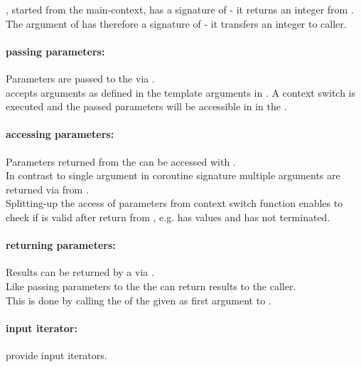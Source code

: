 \coro, started from the main-context, has a signature of  - it
returns an integer from \corofunction.\\
The \coro argument of \corofunction {} has therefore a signature of
 - it transfers an integer to caller.

\paragraph*{passing parameters:}
Parameters are passed to the \corofunction via \coroop.\\
\newline
\coroop accepts arguments as defined in the template arguments in \coro. A
context switch is executed and the passed parameters will be accessible in in
the \corofunction.

\paragraph*{accessing parameters:}
Parameters returned from the \corofunction can be accessed with \coroget.\\
\newline
In contrast to single argument in coroutine signature multiple arguments are
returned via \tuple from \coroget.\\
Splitting-up the access of parameters from context switch function enables to
check if \coro is valid after return from \coroop, e.g. \coro has values and
\corofunction has not terminated.

\paragraph*{returning parameters:}
Results can be returned by a \corofunction via \coroop.\\
\newline
Like passing parameters to the \corofunction the \corofunction can return
results to the caller.\\
This is done by calling the \coroop of the \coro given as first argument to
\corofunction.

\paragraph*{input iterator:}
 provide input iterators.

